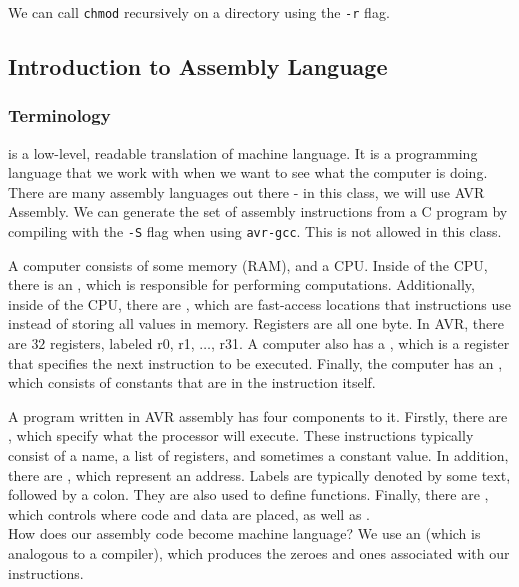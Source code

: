 We can call \verb!chmod! recursively on a directory using the \verb!-r! flag. 


\subsection{Introduction to Assembly Language}

\subsubsection{Terminology}

 is a low-level, readable translation of machine language. It is a programming language that we work with when we want to see what the computer is doing. There are many assembly languages out there - in this class, we will use AVR Assembly. We can generate the set of assembly instructions from a C program by compiling with the \verb!-S! flag when using \verb!avr-gcc!. This is not allowed in this class. 




A computer consists of some memory (RAM), and a CPU. Inside of the CPU, there is an , which is responsible for performing computations. Additionally, inside of the CPU, there are , which are fast-access locations that instructions use instead of storing all values in memory. Registers are all one byte. In AVR, there are $32$ registers, labeled r0, r1, $\ldots$, r31. A computer also has a , which is a register that specifies the next instruction to be executed. Finally, the computer has an , which consists of constants that are in the instruction itself. 



A program written in AVR assembly has four components to it. Firstly, there are , which specify what the processor will execute. These instructions typically consist of a name, a list of registers, and sometimes a constant value. In addition, there are , which represent an address. Labels are typically denoted by some text, followed by a colon. They are also used to define functions. Finally, there are , which controls where code and data are placed, as well as . \\

How does our assembly code become machine language? We use an  (which is analogous to a compiler), which produces the zeroes and ones associated with our instructions. 

